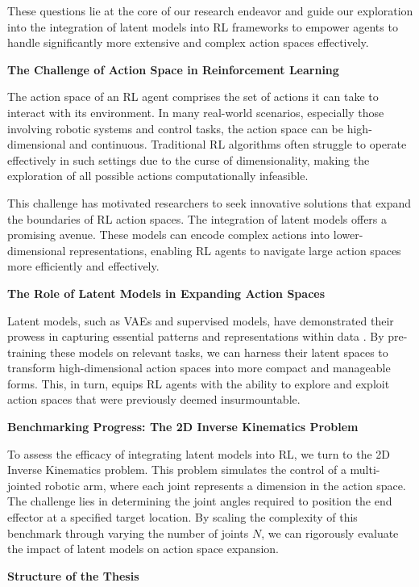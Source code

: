 These questions lie at the core of our research endeavor and guide our exploration into the integration of latent models into RL frameworks to empower agents to handle significantly more extensive and complex action spaces effectively.


\textbf{The Challenge of Action Space in Reinforcement Learning}

The action space of an RL agent comprises the set of actions it can take to interact with its environment. In many real-world scenarios, especially those involving robotic systems and control tasks, the action space can be high-dimensional and continuous. Traditional RL algorithms often struggle to operate effectively in such settings due to the curse of dimensionality, making the exploration of all possible actions computationally infeasible.

This challenge has motivated researchers to seek innovative solutions that expand the boundaries of RL action spaces. The integration of latent models offers a promising avenue. These models can encode complex actions into lower-dimensional representations, enabling RL agents to navigate large action spaces more efficiently and effectively.

\textbf{The Role of Latent Models in Expanding Action Spaces}

Latent models, such as VAEs and supervised models, have demonstrated their prowess in capturing essential patterns and representations within data \cite{pml2Book}. By pre-training these models on relevant tasks, we can harness their latent spaces to transform high-dimensional action spaces into more compact and manageable forms. This, in turn, equips RL agents with the ability to explore and exploit action spaces that were previously deemed insurmountable.

\textbf{Benchmarking Progress: The 2D Inverse Kinematics Problem}

To assess the efficacy of integrating latent models into RL, we turn to the 2D Inverse Kinematics problem. This problem simulates the control of a multi-jointed robotic arm, where each joint represents a dimension in the action space. The challenge lies in determining the joint angles required to position the end effector at a specified target location. By scaling the complexity of this benchmark through varying the number of joints $N$, we can rigorously evaluate the impact of latent models on action space expansion.

\textbf{Structure of the Thesis}

